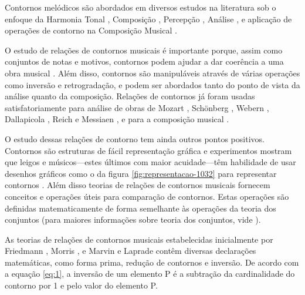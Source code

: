 \documentclass[12pt]{article}
\begin{document}
Contornos melódicos são abordados em diversos estudos na literatura
sob o enfoque da Harmonia Tonal \cite{piston59:harmony}, Composição
\cite{schoenberg67:fundamentals,toch77:shaping}, Percepção
\cite{edworthy85:musical,dewitt.ea86:recognition}, Análise
\cite{adams76:melodic,friedmann85:methodology,friedmann87:response,marvin.ea87:relating,marvin88:generalized,marvin91:perception,marvin.ea95:generalization,morris87:composition,morris93:directions,morris95:compositional,clifford95:contour,beard03:contour,bor09:contour,schultz08:melodic,schultz09:diachronic},
e aplicação de operações de contorno na Composição Musical
\cite{sampaio08:em}.

O estudo de relações de contornos musicais é importante porque, assim
como conjuntos de notas e motivos, contornos podem ajudar a dar
coerência a uma obra musical \cite{clifford95:contour}. Além disso,
contornos são manipuláveis através de várias operações como inversão e
retrogradação, e podem ser abordados tanto do ponto de vista da
análise quanto da composição. Relações de contornos já foram usadas
satisfatoriamente para análise de obras de Mozart
\cite{beard03:contour}, Schönberg \cite{friedmann85:methodology},
Webern \cite{clifford95:contour,sampaio08:analise}, Dallapicola
\cite{marvin88:generalized}, Reich \cite{quinn97:fuzzy} e Messiaen
\cite{schultz08:melodic}, e para a composição musical
\cite{sampaio08:em}.

O estudo dessas relações de contorno tem ainda outros pontos
positivos. Contornos são estruturas de fácil representação gráfica e
experimentos mostram que leigos e músicos---estes últimos com maior
acuidade---têm habilidade de usar desenhos gráficos como o da figura
\ref{fig:representacao-1032} para representar contornos
\cite[p. 69]{marvin88:generalized}. Além disso teorias de relações de
contornos musicais fornecem conceitos e operações úteis para
comparação de contornos. Estas operações são definidas matematicamente
de forma semelhante às operações da teoria dos conjuntos (para maiores
informações sobre teoria dos conjuntos, vide
\cite{straus90:introduction}).

As teorias de relações de contornos musicais estabelecidas
inicialmente por Friedmann \cite{friedmann85:methodology}, Morris
\cite{morris87:composition,morris93:directions}, e Marvin e Laprade
\cite{marvin.ea87:relating,marvin88:generalized} contêm diversas
declarações matemáticas, como forma prima, redução de contornos e
inversão. De acordo com a equação \ref{eq:1}, a inversão de um
elemento P é a subtração da cardinalidade do contorno por 1 e pelo
valor do elemento P.
\end{document}
